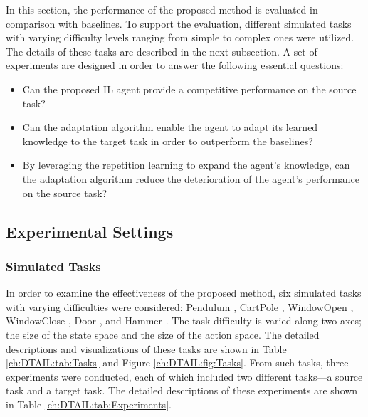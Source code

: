 In this section,
the performance of the proposed method is evaluated in comparison with baselines.
To support the evaluation,
different simulated tasks with varying difficulty levels ranging from simple to complex ones were utilized.
The details of these tasks are described in the next subsection.
A set of experiments are designed in order to answer the following essential questions:


\begin{itemize}
  \item Can the proposed IL agent provide a competitive performance on the source task?
  \item Can the adaptation algorithm enable the agent to adapt its learned knowledge to the target task in order to outperform the baselines?
  \item By leveraging the repetition learning to expand the agent's knowledge, can the adaptation algorithm reduce the deterioration of the agent's performance on the source task?
\end{itemize}


\subsection{Experimental Settings}
\subsubsection{Simulated Tasks}


In order to examine the effectiveness of the proposed method,
six simulated tasks with varying difficulties were considered:
Pendulum \cite{Env_OpenAIGym},
CartPole \cite{Env_OpenAIGym, Env_CartPole},
WindowOpen \cite{Env_MetaWorld},
WindowClose \cite{Env_MetaWorld},
Door \cite{Env_Adroit},
and Hammer \cite{Env_Adroit}.
The task difficulty is varied along two axes;
the size of the state space and the size of the action space.
The detailed descriptions and visualizations of these tasks are shown in Table \ref{ch:DTAIL:tab:Tasks} and Figure \ref{ch:DTAIL:fig:Tasks}.
From such tasks,
three experiments were conducted,
each of which included two different tasks---a source task and a target task.
The detailed descriptions of these experiments are shown in Table \ref{ch:DTAIL:tab:Experiments}.

